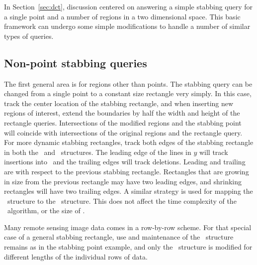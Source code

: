 \documentclass{stdbm}
\newcommand{\ct}{\id{DCT}}
\newcommand{\inC}[1]{{\id{DCT_{#1}}}}
\newcommand{\X}{{\inC{X}}}
\newcommand{\Y}{{\inC{Y}}}
\newcommand{\A}{{\inC{A}}}
\begin{document}
In Section~\ref{sec:dct}, discussion centered on answering a simple
stabbing query for a single point and a number of regions in a two
dimensional space.  This basic framework can undergo some simple
modifications to handle a number of similar types of queries.

\vspace*{-1ex}
\subsection{Non-point stabbing queries}
%
The first general area is for regions other than points.  The stabbing
query can be changed from a single point to a constant size rectangle
very simply.  In this case, track the center location of the stabbing
rectangle, and when inserting new regions of interest, extend the
boundaries by half the width and height of the rectangle queries.
Intersections of the modified regions and the stabbing point will
coincide with intersections of the original regions and the rectangle
query.  For more dynamic stabbing rectangles, track both edges of the
stabbing rectangle in both the \Y\ and \X\ structures.  The leading
edge of the lines in $y$ will track insertions into \A\ and the
trailing edges will track deletions.  Leading and trailing are with
respect to the previous stabbing rectangle.  Rectangles that are
growing in size from the previous rectangle may have two leading
edges, and shrinking rectangles will have two trailing edges.  A
similar strategy is used for mapping the \X\ structure to the \A\ 
structure.  This does not affect the time complexity of the
\ algorithm, or the size of \ct.

Many remote sensing image data comes in a row-by-row scheme.  For that
special case of a general stabbing rectangle, use and maintenance of
the \Y\ structure remains as in the stabbing point example, and only
the \X\ structure is modified for different lengths of the individual
rows of data.

\vspace*{-1ex}
\end{document}
